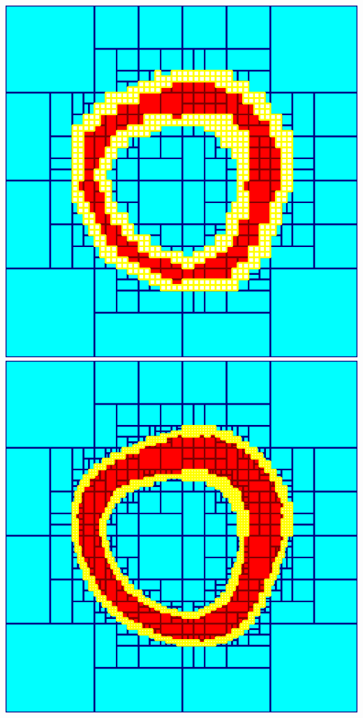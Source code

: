 \documentclass{beamer}
\begin{document}
\begin{frame}
    \includegraphics[scale=0.13]{subpaving1.png}
    \includegraphics[scale=0.13]{subpaving2.png}

\end{frame}
\end{document}
